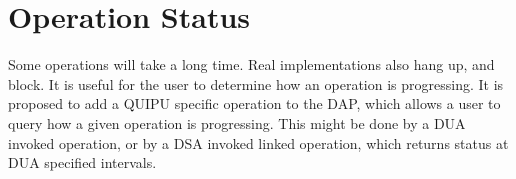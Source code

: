 \section {Operation Status}

Some operations will take a long time.  Real implementations also hang up,
and block.  It is useful for the user to determine how an operation is
progressing.  It is proposed to add a QUIPU specific operation to the DAP,
which allows a user to query how a given operation is progressing.  
This might be done by a DUA invoked operation, or by a DSA invoked linked
operation, which returns status at DUA specified intervals.

